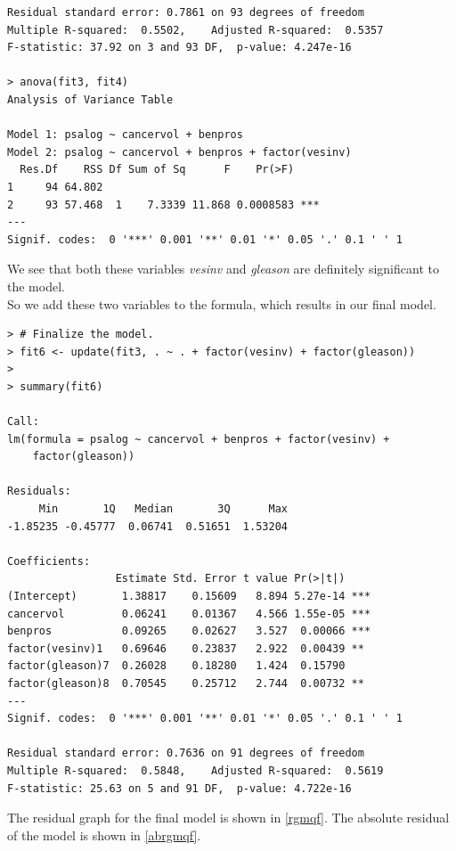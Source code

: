 \documentclass[12pt,letterpaper,titlepage,en-US]{article}
\begin{document}
\begin{lstlisting}
Residual standard error: 0.7861 on 93 degrees of freedom
Multiple R-squared:  0.5502,    Adjusted R-squared:  0.5357
F-statistic: 37.92 on 3 and 93 DF,  p-value: 4.247e-16

> anova(fit3, fit4)
Analysis of Variance Table

Model 1: psalog ~ cancervol + benpros
Model 2: psalog ~ cancervol + benpros + factor(vesinv)
  Res.Df    RSS Df Sum of Sq      F    Pr(>F)
1     94 64.802
2     93 57.468  1    7.3339 11.868 0.0008583 ***
---
Signif. codes:  0 '***' 0.001 '**' 0.01 '*' 0.05 '.' 0.1 ' ' 1
\end{lstlisting}

We see that both these variables \textit{vesinv} and \textit{gleason} are definitely
significant to the model.\\
 So we add these two variables to the formula, which results in our final model.
\begin{lstlisting}
> # Finalize the model.
> fit6 <- update(fit3, . ~ . + factor(vesinv) + factor(gleason))
>
> summary(fit6)

Call:
lm(formula = psalog ~ cancervol + benpros + factor(vesinv) +
    factor(gleason))

Residuals:
     Min       1Q   Median       3Q      Max
-1.85235 -0.45777  0.06741  0.51651  1.53204

Coefficients:
                 Estimate Std. Error t value Pr(>|t|)
(Intercept)       1.38817    0.15609   8.894 5.27e-14 ***
cancervol         0.06241    0.01367   4.566 1.55e-05 ***
benpros           0.09265    0.02627   3.527  0.00066 ***
factor(vesinv)1   0.69646    0.23837   2.922  0.00439 **
factor(gleason)7  0.26028    0.18280   1.424  0.15790
factor(gleason)8  0.70545    0.25712   2.744  0.00732 **
---
Signif. codes:  0 '***' 0.001 '**' 0.01 '*' 0.05 '.' 0.1 ' ' 1

Residual standard error: 0.7636 on 91 degrees of freedom
Multiple R-squared:  0.5848,    Adjusted R-squared:  0.5619
F-statistic: 25.63 on 5 and 91 DF,  p-value: 4.722e-16
\end{lstlisting}

\pagebreak
The residual graph for the final model is shown in \cref{rgmqf}.
The absolute residual of the model is shown in \cref{abrgmqf}.
\end{document}
